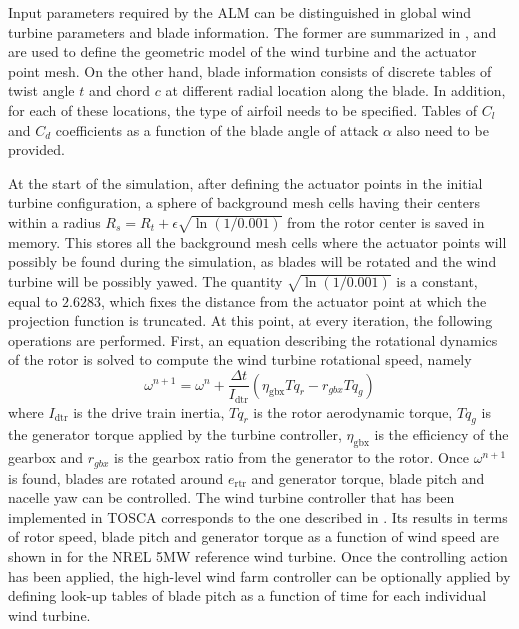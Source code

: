 Input parameters required by the ALM can be distinguished in global wind turbine parameters and blade information. The former are summarized in , and are used to define the geometric model of the wind turbine and the actuator point mesh. On the other hand, blade information consists of discrete tables of twist angle $t$ and chord $c$ at different radial location along the blade. In addition, for each of these locations, the type of airfoil needs to be specified. Tables of $C_l$ and $C_d$ coefficients as a function of the blade angle of attack $\alpha$ also need to be provided.

At the start of the simulation, after defining the actuator points in the initial turbine configuration, a sphere of background mesh cells having their centers within a radius $R_s=R_t + \epsilon\sqrt{\ln(1/0.001)}$ from the rotor center is saved in memory. This stores all the background mesh cells where the actuator points will possibly be found during the simulation, as blades will be rotated and the wind turbine will be possibly yawed. The quantity $\sqrt{\ln(1/0.001)}$ is a constant, equal to $2.6283$, which fixes the distance from the actuator point at which the projection function is truncated. At this point, at every iteration, the following operations are performed. First, an equation describing the rotational dynamics of the rotor is solved to compute the wind turbine rotational speed, namely
\begin{equation}
	\omega^{n+1} = \omega^n + \frac{\Delta t}{I_\text{dtr}}\left(\eta_\text{gbx}Tq_r - r_\textit{gbx} Tq_g\right) \label{eq:rotorDynamics}
\end{equation}
where $I_\text{dtr}$ is the drive train inertia, $Tq_r$ is the rotor aerodynamic torque, $Tq_g$ is the generator torque applied by the turbine controller, $\eta_\text{gbx}$ is the efficiency of the gearbox and $r_\textit{gbx}$ is the gearbox ratio from the generator to the rotor. Once $\omega^{n+1}$ is found, blades are rotated around $e_\text{rtr}$ and generator torque, blade pitch and nacelle yaw can be controlled. The wind turbine controller that has been implemented in TOSCA corresponds to the one described in \cite{JonkmanEtAl2009}. Its results in terms of rotor speed, blade pitch and generator torque as a function of wind speed are shown in  for the NREL 5MW reference wind turbine. Once the controlling action has been applied, the high-level wind farm controller can be optionally applied by defining look-up tables of blade pitch as a function of time for each individual wind turbine.
